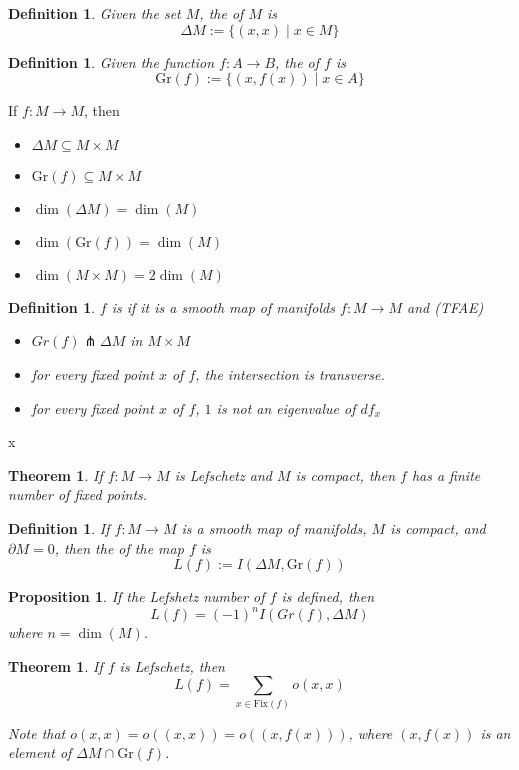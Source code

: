 \documentclass[11pt]{amsbook}
\theoremstyle{mystyle} \newtheorem{thrm}[thm]{Theorem}
\theoremstyle{mystyle} \newtheorem{defi}[thm]{Definition}
\theoremstyle{mystyle} \newtheorem{coro}[thm]{Corollary}
\theoremstyle{mystyle} \newtheorem{propo}[thm]{Proposition}
\theoremstyle{mystyle} \newtheorem{lemm}[thm]{Lemma}
\numberwithin{thm}{section}
\newcommand{\Fix}{\text{Fix}}
\newcommand{\Gr}{\text{Gr}}
\renewcommand{\d}{\partial}
\newcommand{\transverse}{\pitchfork}
\newcommand{\x}{\times}
\begin{document}
\begin{defi}
	Given the set $M$, the  of $M$ is $$\Delta M := \{ (x,x) \mid x \in M \}$$
\end{defi}
\begin{defi}
	Given the function $f: A \to B$, the  of $f$ is $$\Gr(f) := \{ (x, f(x)) \mid x \in A \}$$
\end{defi}
\begin{rmk}
	If $f: M \to M$, then
	\begin{itemize}
		\item $\Delta M \subseteq M \x M$
		\item $\Gr(f) \subseteq M \x M$
		\item $\dim(\Delta M) = \dim(M)$
		\item $\dim(\Gr(f)) = \dim(M)$
		\item $\dim(M \x M) = 2\dim(M)$
	\end{itemize}
\end{rmk}
\begin{defi}
	$f$ is  if it is a smooth map of manifolds $f: M \to M$ and (TFAE)
	\begin{itemize}
		\item $Gr(f) \transverse \Delta M$ in $M \x M$
		\item for every fixed point $x$ of $f$, the intersection is transverse.
		\item for every fixed point $x$ of $f$, $1$ is not an eigenvalue of $df_x$
	\end{itemize}
\end{defi}

x\begin{thrm}
	If $f: M \to M$ is Lefschetz and $M$ is compact, then $f$ has a finite number of fixed points.
\end{thrm}
\begin{defi}
	If $f : M \to M$ is a smooth map of manifolds, $M$ is compact, and $\d M = 0$, then the  of the map $f$ is $$L(f) := I(\Delta M, \Gr(f))$$
\end{defi}
\begin{propo}
	If the Lefshetz number of $f$ is defined, then $$L(f) = (-1)^n I(Gr(f), \Delta M)$$ where $n = \dim(M)$.
\end{propo}
\begin{thrm}
	If $f$ is Lefschetz, then $$L(f) = \sum_{x \in \Fix(f)} o(x,x)$$

	Note that $o(x,x) = o((x,x)) = o((x,f(x)))$, where $(x, f(x))$ is an element of $\Delta M \cap \Gr(f)$.
\end{thrm}
\end{document}

